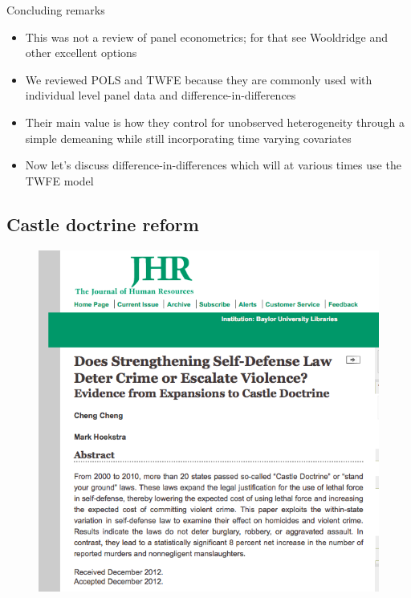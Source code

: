 \documentclass{beamer}
\begin{document}
\begin{frame}{Concluding remarks}

\begin{itemize}
\item This was not a review of panel econometrics; for that see Wooldridge and other excellent options
\item We reviewed POLS and TWFE because they are commonly used with individual level panel data and difference-in-differences
\item Their main value is how they control for unobserved heterogeneity through a simple demeaning while still incorporating time varying covariates
\item Now let's discuss difference-in-differences which will at various times use the TWFE model
\end{itemize}

\end{frame}

\subsection{Castle doctrine reform}


\begin{frame}[plain]
	\begin{figure}
	\includegraphics[scale=0.5]{./lecture_includes/cheng_and_hoekstra_jhr.png}
	\end{figure}

\end{frame}
\end{document}
